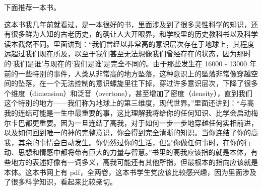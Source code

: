 下面推荐一本书。

\begin{book}[《生命之花的古老秘密》]
    这本书我几年前就看过，是一本很好的书，里面涉及到了很多灵性科学的知识，还有很多鲜为人知的古老历史，的确让人大开眼界，和学校里的历史教科书以及科学读本截然不同。里面讲到：“我们曾经以非常高的意识层次存在于地球上，其程度远超过我们现在所及，以至于我们甚至无法想像我们曾经存在的状态，因为那时的‘我们是谁’与现在的‘我们是谁’是完全不同的。由于那些发生在 16000 - 13000 年前的一些特别的事件，人类从非常高的地方坠落，这种意识上的坠落非常像穿越空间的坠落，在一个无法控制的意识螺旋里往下掉，穿过许多意识层次，下降了很多个维度（dimension）和泛音（overtone），甚至增加了密度（density），直到我们这个特别的地方——我们称为地球上的第三维度，现代世界。”里面还讲到：“与高我的连结可能是一生中最重要的事，这比理解我将给你的任何知识、比学会启动梅尔卡巴都更重要。因为一旦连结了高我，对于如何一步一步地穿越任何实相前进，以及如何回到唯一的神的完整意识，你会得到完全清晰的知识。当你连结了你的高我，其余的事情会自动发生。你仍然过你的生活，但是你做任何事时，在你的行动、思想和情感中都将带有巨大的力量与智慧。”书里的高我应该指的就是本体，有些地方的表述好像有一词多义，高我可能还有其他所指，但最根本的指向应该就是本体。这本书网上有 pdf，全两卷，这本书学生党应该比较感兴趣，因为里面涉及了很多科学知识，看起来比较亲切。
\end{book}
